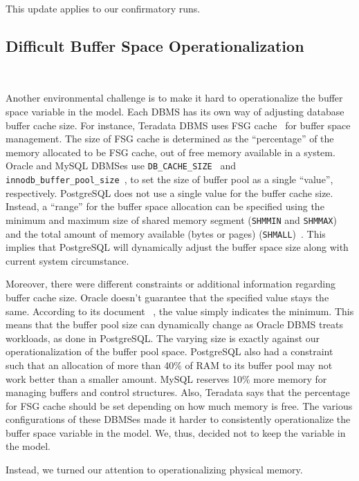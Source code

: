This update applies to our confirmatory runs. 

\subsection{Difficult Buffer Space Operationalization}~\label{sec:buffer_space_oper}

Another environmental challenge is to make it hard to 
operationalize the buffer space variable in the model. 
Each \hbox{DBMS} has its own way of adjusting database buffer cache size. 
For instance, Teradata DBMS uses FSG cache~\cite{tdbc} for buffer space management. 
The size of FSG cache is determined as the ``percentage'' of the memory allocated to be FSG cache, 
out of free memory available in a system. 
Oracle and MySQL \hbox{DBMSes} use {\tt DB\_CACHE\_SIZE}~\cite{oraclebc} and {\tt innodb\_buffer\_pool\_size}~\cite{mysqlbc}, 
to set the size of buffer pool as a single ``value'', respectively.
\hbox{PostgreSQL} does not use a single value for the buffer cache size. 
Instead, a ``range'' for the buffer space allocation can be specified using the minimum and maximum size 
of shared memory segment ({\tt SHMMIN} and {\tt SHMMAX}) and 
the total amount of memory available (bytes or pages) ({\tt SHMALL})~\cite{pgdbc}. 
This implies that \hbox{PostgreSQL} will dynamically adjust the buffer space size along with current system circumstance.

Moreover, there were different constraints or additional information regarding buffer cache size. 
Oracle doesn't guarantee that the specified value stays the same. 
According to its document~\cite{oraclebc} , the value simply indicates the minimum. 
This means that the buffer pool size can dynamically change as Oracle DBMS treats workloads, 
as done in \hbox{PostgreSQL}. 
The varying size is exactly against our operationalization of the buffer pool space. 
\hbox{PostgreSQL} also had a constraint such that an allocation of more than 40\% of RAM to its buffer pool 
may not work better than a smaller amount. 
MySQL reserves 10\% more memory for managing buffers and control structures. 
Also, Teradata says that the percentage for FSG cache should be set depending on how much memory is free. 
The various configurations of these DBMSes made it harder to consistently operationalize the buffer space variable in the model. 
We, thus, decided not to keep the variable in the model.

Instead, we turned our attention to operationalizing physical memory. 

